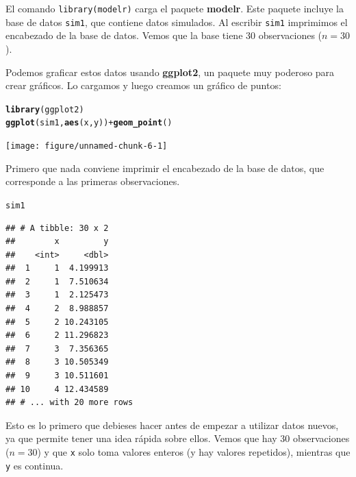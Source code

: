\documentclass{article}\usepackage[]{graphicx}\usepackage[]{color}
\makeatletter
\newcommand{\hlopt}[1]{\textcolor[rgb]{0,0,0}{#1}}%
\newcommand{\hlstd}[1]{\textcolor[rgb]{0.345,0.345,0.345}{#1}}%
\newcommand{\hlkwd}[1]{\textcolor[rgb]{0.737,0.353,0.396}{\textbf{#1}}}%
\newenvironment{kframe}{%
 \def\at@end@of@kframe{}%
 \ifinner\ifhmode%
  \def\at@end@of@kframe{\end{minipage}}%
  \begin{minipage}{\columnwidth}%
 \fi\fi%
 \def\FrameCommand##1{\hskip\@totalleftmargin \hskip-\fboxsep
 \colorbox{shadecolor}{##1}\hskip-\fboxsep
     \hskip-\linewidth \hskip-\@totalleftmargin \hskip\columnwidth}%
 \MakeFramed {\advance\hsize-\width
   \@totalleftmargin\z@ \linewidth\hsize
   \@setminipage}}%
 {\par\unskip\endMakeFramed%
 \at@end@of@kframe}
\newenvironment{knitrout}{}{} %
\newcommand*{\paq}[1]{\textbf{#1}}
\makeatother
\begin{document}
El comando \verb|library(modelr)| carga el paquete \paq{modelr}. Este paquete incluye la base de datos \verb|sim1|, que contiene datos simulados. Al escribir \verb|sim1| imprimimos el encabezado de la base de datos. Vemos que la base tiene 30 observaciones ($n=30$).

Podemos graficar estos datos usando \paq{ggplot2}, un paquete muy poderoso para crear gráficos. Lo cargamos y luego creamos un gráfico de puntos:

\begin{knitrout}
\color{fgcolor}\begin{kframe}
\begin{alltt}
\hlkwd{library}\hlstd{(ggplot2)}
\hlkwd{ggplot}\hlstd{(sim1,} \hlkwd{aes}\hlstd{(x, y))} \hlopt{+} \hlkwd{geom_point}\hlstd{()}
\end{alltt}
\end{kframe}

{\centering \texttt{[image: figure/unnamed-chunk-6-1]} 

}



\end{knitrout}

Primero que nada conviene imprimir el encabezado de la base de datos, que corresponde a las primeras observaciones.

\begin{knitrout}
\color{fgcolor}\begin{kframe}
\begin{alltt}
\hlstd{sim1}
\end{alltt}
\begin{verbatim}
## # A tibble: 30 x 2
##        x         y
##    <int>     <dbl>
##  1     1  4.199913
##  2     1  7.510634
##  3     1  2.125473
##  4     2  8.988857
##  5     2 10.243105
##  6     2 11.296823
##  7     3  7.356365
##  8     3 10.505349
##  9     3 10.511601
## 10     4 12.434589
## # ... with 20 more rows
\end{verbatim}
\end{kframe}
\end{knitrout}

Esto es lo primero que debieses hacer antes de empezar a utilizar datos nuevos, ya que permite tener una idea rápida sobre ellos. Vemos que hay 30 observaciones ($n=30$) y que \verb|x| solo toma valores enteros (y hay valores repetidos), mientras que \verb|y| es continua.
\end{document}
